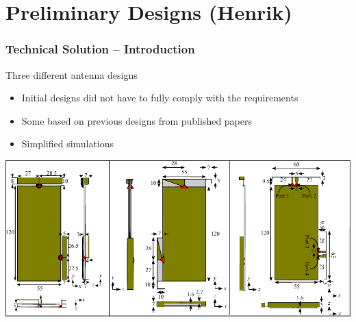 \section[Preliminary Designs]{Preliminary Designs (Henrik)}
\begin{frame}
    \frametitle{Technical Solution -- Introduction}
    \begin{block}{Three different antenna designs}
      \begin{itemize}
      \item Initial designs did not have to fully comply with the requirements
      \item Some based on previous designs from published papers
      \item Simplified simulations
      \end{itemize}
    \end{block}
\vspace*{-0.5cm}
  \begin{center} 
    \includegraphics[width=\textwidth]{img/henrik/all_td}%

  \end{center}
\end{frame}


